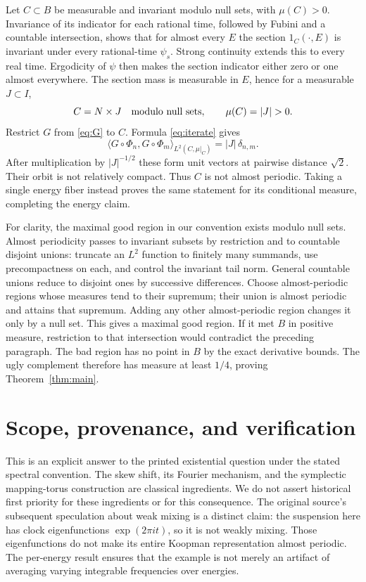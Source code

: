 \documentclass[11pt]{article}
\begin{document}
Let $C\subset B$ be measurable and invariant modulo null sets, with
$\mu(C)>0$. Invariance of its indicator for each rational time, followed by
Fubini and a countable intersection, shows that for almost every $E$ the
section $1_C(\cdot,E)$ is invariant under every rational-time $\psi_s$.
Strong continuity extends this to every real time. Ergodicity of $\psi$
then makes the section indicator either zero or one almost everywhere.
The section mass is measurable in $E$, hence for a measurable $J\subset I$,
\[
 C=N\times J\quad\hbox{modulo null sets},\qquad \mu(C)=|J|>0.
\]
Restrict $G$ from \eqref{eq:G} to $C$. Formula \eqref{eq:iterate} gives
\[
 \langle G\circ\Phi_n,G\circ\Phi_m\rangle_{L^2(C,\mu|_C)}
 =|J|\,\delta_{n,m}.
\]
After multiplication by $|J|^{-1/2}$ these form unit vectors at pairwise
distance $\sqrt2$. Their orbit is not relatively compact. Thus $C$ is
not almost periodic. Taking a single energy fiber instead proves the same
statement for its conditional measure, completing the energy claim.

For clarity, the maximal good region in our convention exists modulo null
sets. Almost periodicity passes to invariant subsets by restriction and to
countable disjoint unions: truncate an $L^2$ function to finitely many
summands, use precompactness on each, and control the invariant tail norm.
General countable unions reduce to disjoint ones by successive differences.
Choose almost-periodic regions whose measures tend to their supremum;
their union is almost periodic and attains that supremum. Adding any other
almost-periodic region changes it only by a null set. This gives a maximal
good region. If it met $B$ in positive measure, restriction to that
intersection would contradict the preceding paragraph. The bad region
has no point in $B$ by the exact derivative bounds. The ugly complement
therefore has measure at least $1/4$, proving Theorem~\ref{thm:main}.

\section{Scope, provenance, and verification}

This is an explicit answer to the printed existential question under the
stated spectral convention. The skew shift, its Fourier mechanism, and the
symplectic mapping-torus construction are classical ingredients. We do not
assert historical first priority for these ingredients or for this consequence.
The original source's subsequent speculation about weak mixing is a distinct
claim: the suspension here has clock eigenfunctions $\exp(2\pi i t)$,
so it is not weakly mixing. Those eigenfunctions do not make its entire
Koopman representation almost periodic. The per-energy result ensures
that the example is not merely an artifact of averaging varying integrable
frequencies over energies.
\end{document}
